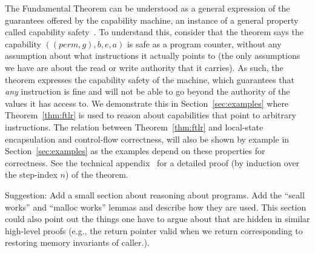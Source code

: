 \documentclass[format=acmsmall, review=false, screen=true]{acmart}
\renewcommand{\sectionname}{Section}
\newcommand{\var}[1]{\mathit{#1}}
\newcommand{\gl}{\var{g}}
\newcommand{\addr}{\var{a}}
\newcommand{\start}{\var{b}}
\newcommand{\addrend}{\var{e}}
\newcommand{\perm}{\var{perm}}
\newcommand{\itoplassug}[1]
    {{\color{Blue} #1}}
\begin{document}
The Fundamental Theorem can be understood as a general expression of the
guarantees offered by the capability machine, an instance of a general property
called capability safety~\citep{Devriese:2016ObjCap,Maffeis2010OC}. To
understand this, consider that the theorem says the capability
$((\perm,\gl),\start,\addrend,\addr)$ is safe as a program counter, without any
assumption about what instructions it actually points to (the only assumptions
we have are about the read or write authority that it carries). As such, the
theorem expresses the capability safety of the machine, which guarantees that
\emph{any} instruction is fine and will not be able to go beyond the authority
of the values it has access to. We demonstrate this in
\sectionname~\ref{sec:examples} where Theorem~\ref{thm:ftlr} is used to reason about
capabilities that point to arbitrary instructions. The relation between
Theorem~\ref{thm:ftlr} and local-state encapsulation and control-flow
correctness, will also be shown by example in \sectionname~\ref{sec:examples} as the
examples depend on these properties for correctness.
See the technical appendix~\citep{technical_appendix} for a detailed
proof (by induction over the step-index $n$) of the theorem.


\itoplassug{Suggestion: Add a small section about reasoning about programs. Add the ``scall works'' and ``malloc works'' lemmas and describe how they are used. This section could also point out the things one have to argue about that are hidden in similar high-level proofs (e.g., the return pointer valid when we return corresponding to restoring memory invariants of caller.).}
\end{document}
